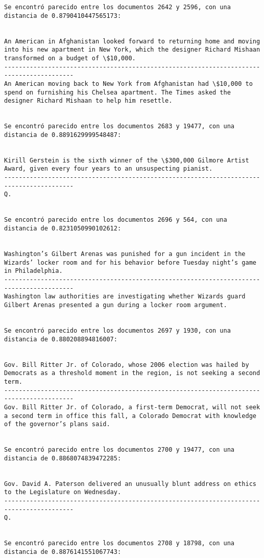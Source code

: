 \documentclass[11pt]{article}
\begin{document}
\begin{Verbatim}[commandchars=\\\{\}]
Se encontró parecido entre los documentos 2642 y 2596, con una distancia de 0.8790410447565173:


An American in Afghanistan looked forward to returning home and moving into his new apartment in New York, which the designer Richard Mishaan transformed on a budget of \$10,000.
-----------------------------------------------------------------------------------------
An American moving back to New York from Afghanistan had \$10,000 to spend on furnishing his Chelsea apartment. The Times asked the designer Richard Mishaan to help him resettle. 


Se encontró parecido entre los documentos 2683 y 19477, con una distancia de 0.8891629999548487:


Kirill Gerstein is the sixth winner of the \$300,000 Gilmore Artist Award, given every four years to an unsuspecting pianist.
-----------------------------------------------------------------------------------------
Q.


Se encontró parecido entre los documentos 2696 y 564, con una distancia de 0.8231050990102612:


Washington’s Gilbert Arenas was punished for a gun incident in the Wizards’ locker room and for his behavior before Tuesday night’s game in Philadelphia.
-----------------------------------------------------------------------------------------
Washington law authorities are investigating whether Wizards guard Gilbert Arenas presented a gun during a locker room argument.


Se encontró parecido entre los documentos 2697 y 1930, con una distancia de 0.880208894816007:


Gov. Bill Ritter Jr. of Colorado, whose 2006 election was hailed by Democrats as a threshold moment in the region, is not seeking a second term.
-----------------------------------------------------------------------------------------
Gov. Bill Ritter Jr. of Colorado, a first-term Democrat, will not seek a second term in office this fall, a Colorado Democrat with knowledge of the governor’s plans said.


Se encontró parecido entre los documentos 2700 y 19477, con una distancia de 0.8868074839472285:


Gov. David A. Paterson delivered an unusually blunt address on ethics to the Legislature on Wednesday.
-----------------------------------------------------------------------------------------
Q.


Se encontró parecido entre los documentos 2708 y 18798, con una distancia de 0.8876141551067743:



\end{Verbatim}
\end{document}

